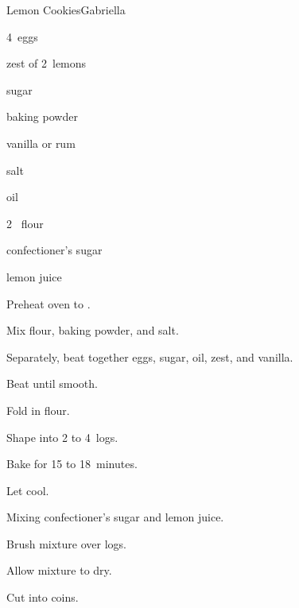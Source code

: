 \begin{recipe}{Lemon Cookies}{Gabriella}{}

\begin{ingredients}
\item 4~eggs
\item zest of 2~lemons
\item \C{\threequarter} sugar
\item {} baking powder
\item {} vanilla or rum
\item \tp{\half} salt
\item \C{\threequarter} oil
\item 2~\C{2\half} flour
\item confectioner's sugar
\item lemon juice
\end{ingredients}

\begin{directions}
\item Preheat oven to .
\item Mix flour, baking powder, and salt.
\item Separately, beat together eggs, sugar, oil, zest, and vanilla.
\item Beat until smooth.
\item Fold in flour.
\item Shape into 2 to 4~logs.
\item Bake for 15 to 18~minutes.
\item Let cool.
\item Mixing confectioner's sugar and lemon juice.
\item Brush mixture over logs.
\item Allow mixture to dry.
\item Cut into coins.
\end{directions}

\end{recipe}
